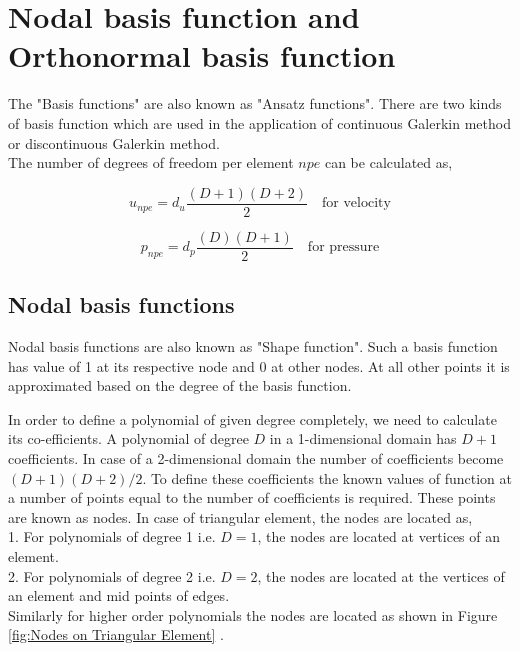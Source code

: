 \documentclass[a4paper]{book}
\begin{document}
\section[Basis function]{Nodal basis function and Orthonormal basis function}

The "Basis functions" are also known as "Ansatz functions". There are two kinds of basis function which are used in the application of continuous Galerkin method or discontinuous Galerkin method. \\

The number of degrees of freedom per element $npe$ can be calculated as,

\begin{equation} \label{unpe}
u_{npe} = d_u \frac{(D+1)(D+2)}{2} \quad \textrm{for velocity}
\end{equation} 

\begin{equation} \label{pnpe}
p_{npe} = d_p \frac{(D)(D+1)}{2} \quad \textrm{for pressure}
\end{equation} 


\subsection{Nodal basis functions}

Nodal basis functions are also known as "Shape function". Such a basis function has value of 1 at its respective node and 0 at other nodes. At all other points it is approximated based on the degree of the basis function. 

In order to define a polynomial of given degree completely, we need to calculate its co-efficients. A polynomial of degree $D$ in a 1-dimensional domain has $D+1$ coefficients. In case of a 2-dimensional domain the number of coefficients become $(D+1)(D+2)/2$. To define these coefficients the known values of function at a number of points equal to the number of coefficients is required. These points are known as nodes. In case of triangular element, the nodes are located as,\\
1. For polynomials of degree 1 i.e. $D=1$, the nodes are located at vertices of an element.\\
2. For polynomials of degree 2 i.e. $D=2$, the nodes are located at the vertices of an element and mid points of edges.\\
Similarly for higher order polynomials the nodes are located as shown in Figure \ref{fig:Nodes on Triangular Element} . 
\end{document}
